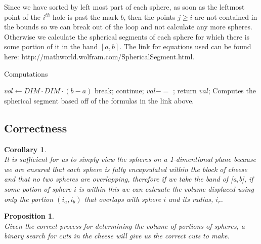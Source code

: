 \documentclass[12pt]{article}
\newtheorem{corollary}[theorem]{Corollary}
\newtheorem{proposition}[theorem]{Proposition}
\begin{document}
Since we have sorted by left most part of each sphere, as soon as the leftmost point of the $i^{th}$
hole is past the mark $b$, then the points $j \geq i$ are not contained in the bounds so we can break
out of the loop and not calculate any more spheres. Otherwise we calculate the spherical segments of
each sphere for which there is some portion of it in the band $[a,b]$. The link for equations used
can be found here: http://mathworld.wolfram.com/SphericalSegment.html.

\begin{algorithm}[H]
\caption{Computations}
\begin{algorithmic}
        \State $vol \gets DIM\cdot DIM\cdot (b-a)$
                break;
            \EndIf
                continue;
            \EndIf
            \State $val -=$ ;
        \EndFor
        \State return $val$;
    \EndProcedure
        \State Computes the spherical segment based off of the formulas in the link above.
    \EndProcedure
\end{algorithmic}
\end{algorithm}


\subsection{Correctness}
\begin{corollary}
~ \\ \indent It is sufficient for us to simply view the spheres on a 1-dimentional plane because we are
ensured that each sphere is fully encapsulated within the block of cheese and that no two spheres are
overlapping, therefore if we take the band of [a,b], if some potion of sphere $i$ is within this we can
calcuate the volume displaced using only the portion $(i_a, i_b)$ that overlaps with sphere $i$ and its
radius, $i_r$.
\end{corollary}
\begin{proposition}
~ \\ \indent Given the correct process for determining the volume of portions of spheres, a binary search
for cuts in the cheese will give us the correct cuts to make.
\end{proposition}
\end{document}
